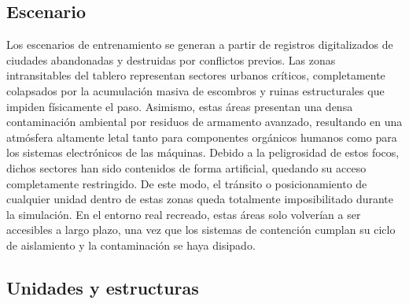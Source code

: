 \subsection{Escenario}

Los escenarios de entrenamiento se generan a partir de registros digitalizados de ciudades abandonadas y destruidas por conflictos previos. Las zonas intransitables del tablero representan sectores urbanos críticos, completamente colapsados por la acumulación masiva de escombros y ruinas estructurales que impiden físicamente el paso. Asimismo, estas áreas presentan una densa contaminación ambiental por residuos de armamento avanzado, resultando en una atmósfera altamente letal tanto para componentes orgánicos humanos como para los sistemas electrónicos de las máquinas. Debido a la peligrosidad de estos focos, dichos sectores han sido contenidos de forma artificial, quedando su acceso completamente restringido. De este modo, el tránsito o posicionamiento de cualquier unidad dentro de estas zonas queda totalmente imposibilitado durante la simulación. En el entorno real recreado, estas áreas solo volverían a ser accesibles a largo plazo, una vez que los sistemas de contención cumplan su ciclo de aislamiento y la contaminación se haya disipado.

\clearpage

\subsection{Unidades y estructuras}

